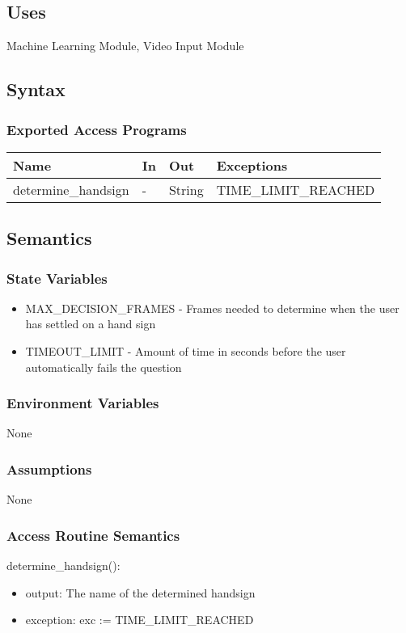 \documentclass[12pt, titlepage]{article}
\begin{document}
\subsection{Uses}
Machine Learning Module, Video Input Module
\subsection{Syntax}
\subsubsection{Exported Access Programs}
\begin{center}
\begin{tabular}{p{4cm} p{2cm} p{2cm} p{4cm}}
\hline
\textbf{Name} & \textbf{In} & \textbf{Out} & \textbf{Exceptions} \\
\hline
determine\_handsign & - & String & TIME\_LIMIT\_REACHED \\
\hline
\end{tabular}
\end{center}
\subsection{Semantics}
\subsubsection{State Variables}
\begin{itemize}
    \item MAX\_DECISION\_FRAMES - Frames needed to determine when the user has settled on a hand sign
    \item TIMEOUT\_LIMIT - Amount of time in seconds before the user automatically fails the question
\end{itemize}
\subsubsection{Environment Variables}
None
\subsubsection{Assumptions}
None
\subsubsection{Access Routine Semantics}
\noindent determine\_handsign():
\begin{itemize}
\item output: The name of the determined handsign
\item exception: exc := TIME\_LIMIT\_REACHED
\end{itemize}
\end{document}
